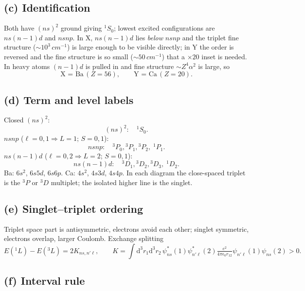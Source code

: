 \documentclass[11pt]{article}
\newcommand{\de}{\mathrm{d}}
\begin{document}
\subsection*{(c) Identification}

Both have $(ns)^2$ ground giving $^1S_0$; lowest excited configurations are $ns(n-1)d$ and $nsnp$. In X, $ns(n-1)d$ lies \emph{below} $nsnp$ and the triplet fine structure ($\sim 10^3\,\si{cm^{-1}}$) is large enough to be visible directly; in Y the order is reversed and the fine structure is so small ($\sim 50\,\si{cm^{-1}}$) that a $\times 20$ inset is needed. In heavy atoms $(n-1)d$ is pulled in and fine structure $\sim Z^4\alpha^2$ is large, so
\begin{equation}
\boxed{\;\text{X = Ba}\,(Z=56),\qquad \text{Y = Ca}\,(Z=20).\;}
\label{eq:identify}
\end{equation}

\subsection*{(d) Term and level labels}

Closed $(ns)^2$:
\[
(ns)^{2}:\quad {}^{1}S_0.
\]
$nsnp$ ($\ell=0,1\Rightarrow L=1$; $S=0,1$):
\[
nsnp:\quad {}^{3}P_0,{}^{3}P_1,{}^{3}P_2,\;{}^{1}P_1.
\]
$ns(n-1)d$ ($\ell=0,2\Rightarrow L=2$; $S=0,1$):
\[
ns(n-1)d:\quad {}^{3}D_1,{}^{3}D_2,{}^{3}D_3,\;{}^{1}D_2.
\]
Ba: $6s^2$, $6s5d$, $6s6p$. Ca: $4s^2$, $4s3d$, $4s4p$. In each diagram the close-spaced triplet is the $^3P$ or $^3D$ multiplet; the isolated higher line is the singlet.

\subsection*{(e) Singlet--triplet ordering}

Triplet space part is antisymmetric, electrons avoid each other; singlet symmetric, electrons overlap, larger Coulomb. Exchange splitting
\begin{equation}
E({}^{1}L)-E({}^{3}L)=2K_{ns,n'\ell},\qquad K=\!\!\int\! \de^{3}r_1 \de^{3}r_2\,\psi_{ns}^{*}(1)\psi_{n'\ell}^{*}(2)\tfrac{e^{2}}{4\pi\epsilon_0 r_{12}}\psi_{n'\ell}(1)\psi_{ns}(2)>0.
\label{eq:exchange}
\end{equation}

\subsection*{(f) Interval rule}
\end{document}
